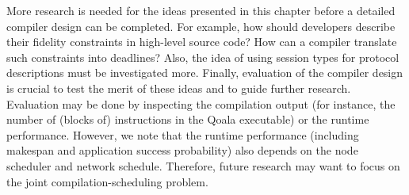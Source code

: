 More research is needed for the ideas presented in this chapter before a detailed compiler design can be completed.
For example, how should developers describe their fidelity constraints in high-level source code?
How can a compiler translate such constraints into deadlines?
Also, the idea of using session types for protocol descriptions must be investigated more.
Finally, evaluation of the compiler design is crucial to test the merit of these ideas and to guide further research.
Evaluation may be done by inspecting the compilation output (for instance, the number of (blocks of) instructions in the Qoala executable) or the runtime performance.
However, we note that the runtime performance (including makespan and application success probability) also depends on the node scheduler and network schedule.
Therefore, future research may want to focus on the joint compilation-scheduling problem.
